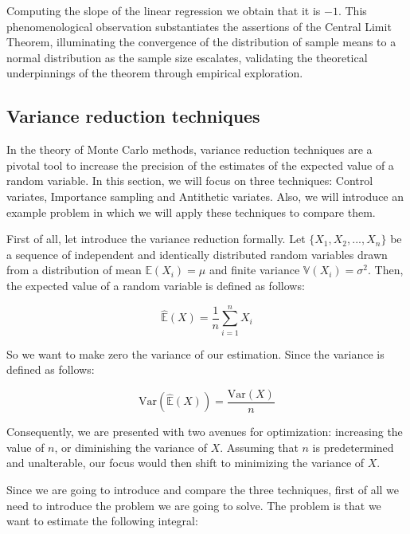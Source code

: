 \documentclass{article}
\begin{document}
Computing the slope of the linear regression we obtain that it is \(-1\). This phenomenological observation substantiates the assertions of the Central Limit Theorem, illuminating the convergence of the distribution of sample means to a normal distribution as the sample size escalates, validating the theoretical underpinnings of the theorem through empirical exploration.

\subsection{Variance reduction techniques}
\label{sec:variance_reduction}

In the theory of Monte Carlo methods, variance reduction techniques are a pivotal tool to increase the precision of the estimates of the expected value of a random variable. In this section, we will focus on three techniques: Control variates, Importance sampling and Antithetic variates. Also, we will introduce an example problem in which we will apply these techniques to compare them.

First of all, let introduce the variance reduction formally. Let \(\{X_1, X_2, ..., X_n\}\) be a sequence of independent and identically distributed random variables drawn from a distribution of mean \(\mathbb{E}(X_i) = \mu\) and finite variance \(\mathbb{V}(X_i) = \sigma^2\). Then, the expected value of a random variable is defined as follows:

\begin{equation} 
	\label{eq:expectedvalueestimate} 
	\hat{\mathbb{E}}(X) = \frac{1}{n} \sum_{i=1}^{n} X_i
\end{equation}

So we want to make zero the variance of our estimation. Since the variance is defined as follows:

\begin{equation} 
	\label{eq:variance} 
	\mathrm{Var}(\hat{\mathbb{E}}(X)) = \frac{\mathrm{Var}(X)}{n}
\end{equation}

Consequently, we are presented with two avenues for optimization: increasing the value of \(n\), or diminishing the variance of \(X\). Assuming that \(n\) is predetermined and unalterable, our focus would then shift to minimizing the variance of \(X\).

Since we are going to introduce and compare the three techniques, first of all we need to introduce the problem we are going to solve. The problem is that we want to estimate the following integral:
\end{document}
